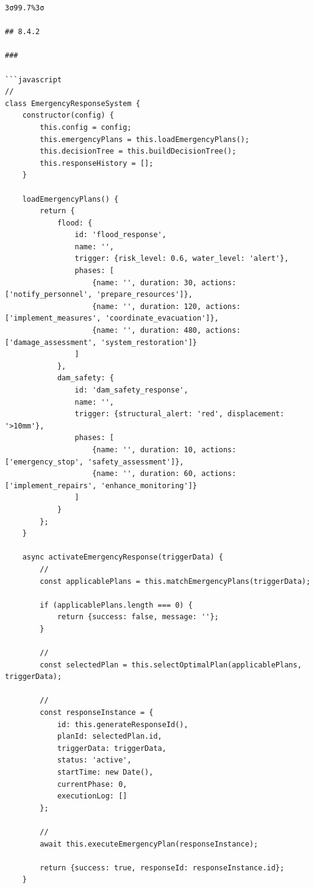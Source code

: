 \begin{verbatim}
3σ99.7%3σ

## 8.4.2 

### 

```javascript
// 
class EmergencyResponseSystem {
    constructor(config) {
        this.config = config;
        this.emergencyPlans = this.loadEmergencyPlans();
        this.decisionTree = this.buildDecisionTree();
        this.responseHistory = [];
    }
    
    loadEmergencyPlans() {
        return {
            flood: {
                id: 'flood_response',
                name: '',
                trigger: {risk_level: 0.6, water_level: 'alert'},
                phases: [
                    {name: '', duration: 30, actions: ['notify_personnel', 'prepare_resources']},
                    {name: '', duration: 120, actions: ['implement_measures', 'coordinate_evacuation']},
                    {name: '', duration: 480, actions: ['damage_assessment', 'system_restoration']}
                ]
            },
            dam_safety: {
                id: 'dam_safety_response', 
                name: '',
                trigger: {structural_alert: 'red', displacement: '>10mm'},
                phases: [
                    {name: '', duration: 10, actions: ['emergency_stop', 'safety_assessment']},
                    {name: '', duration: 60, actions: ['implement_repairs', 'enhance_monitoring']}
                ]
            }
        };
    }
    
    async activateEmergencyResponse(triggerData) {
        // 
        const applicablePlans = this.matchEmergencyPlans(triggerData);
        
        if (applicablePlans.length === 0) {
            return {success: false, message: ''};
        }
        
        // 
        const selectedPlan = this.selectOptimalPlan(applicablePlans, triggerData);
        
        // 
        const responseInstance = {
            id: this.generateResponseId(),
            planId: selectedPlan.id,
            triggerData: triggerData,
            status: 'active',
            startTime: new Date(),
            currentPhase: 0,
            executionLog: []
        };
        
        // 
        await this.executeEmergencyPlan(responseInstance);
        
        return {success: true, responseId: responseInstance.id};
    }
    

\end{verbatim}
